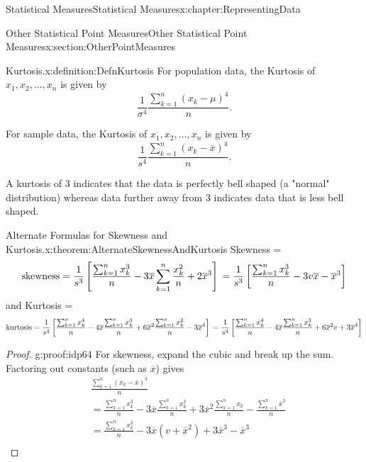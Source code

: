 \documentclass[oneside,10pt,]{book}
\numberwithin{equation}{section}
\begin{document}
\begin{chapterptx}{Statistical Measures}{}{Statistical Measures}{}{}{x:chapter:RepresentingData}
\begin{sectionptx}{Other Statistical Point Measures}{}{Other Statistical Point Measures}{}{}{x:section:OtherPointMeasures}
\par
\begin{definition}{Kurtosis.}{x:definition:DefnKurtosis}%
For population data, the Kurtosis of \(x_1, x_2, ..., x_n\) is given by%
\begin{equation*}
\frac{1}{\sigma^4} \frac{\sum_{k=1}^n ( x_k-\mu )^4}{n}.
\end{equation*}
%
\par
For sample data, the Kurtosis of \(x_1, x_2, ..., x_n\) is given by%
\begin{equation*}
\frac{1}{s^4} \frac{\sum_{k=1}^n ( x_k-\overline{x} )^4}{n}.
\end{equation*}
%
\end{definition}
%
\par
A kurtosis of 3 indicates that the data is perfectly bell shaped (a "normal" distribution) whereas data further away from 3 indicates data that is less bell shaped.%
\begin{theorem}{Alternate Formulas for Skewness and Kurtosis.}{}{x:theorem:AlternateSkewnessAndKurtosis}%
Skewness =%
\begin{equation*}
\text{skewness} = \frac{1}{s^3} 
\left [ \frac{\sum_{k=1}^n x_k^3}{n} - 3 \overline{x}\sum_{k=1}^n \frac{x_k^2}{n} + 2 \overline{x}^3 \right ]
\\ = \frac{1}{s^3} 
\left [ \frac{\sum_{k=1}^n x_k^3}{n} - 3 v \overline{x} - \overline{x}^3 \right ]
\end{equation*}
and Kurtosis =%
\begin{equation*}
\text{kurtosis}  = \frac{1}{s^4} 
\left [ 
\frac{\sum_{k=1}^n x_k^4}{n} - 4 \overline{x} \frac{\sum_{k=1}^n x_k^3 }{n} + 6 \overline{x}^2 \frac{\sum_{k=1}^n x_k^2}{n} - 3 \overline{x}^4  \right ]
\\ = \frac{1}{s^4} \left [ \frac{\sum_{k=1}^n x_k^4}{n} - 4 \overline{x} \frac{\sum_{k=1}^n x_k^3 }{n} + 6 \overline{x}^2 v + 3 \overline{x}^4  
\right ]
\end{equation*}
\begin{proof}{}{g:proof:idp64}
For skewness, expand the cubic and break up the sum. Factoring out constants (such as \(\overline{x}\)) gives%
\begin{align*}
& \frac{\sum_{k=1}^n ( x_k-\overline{x} )^3}{n}\\
& = \frac{\sum_{k=1}^n x_k^3}{n} - 3 \overline{x} \frac{\sum_{k=1}^n x_k^2 }{n} + 3 \overline{x}^2 \frac{\sum_{k=1}^n x_k}{n} - \frac{\sum_{k=1}^n \overline{x}^3}{n}\\
& = \frac{\sum_{k=1}^n x_k^3}{n} - 3 \overline{x}(v + \overline{x}^2) + 3 \overline{x}^3 - \overline{x}^3\\

\end{align*}
\end{proof}
\end{theorem}
\end{sectionptx}
\end{chapterptx}
\end{document}
